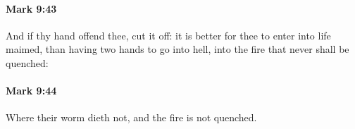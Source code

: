 		\paragraph{Mark 9:43} %
			\label{MARK-9-43}

			And if thy hand offend thee, cut it off: it is better for thee to enter into life maimed, than having two hands to go into hell, into the fire that never shall be quenched:

			\begin{framed}
			\scriptsize
				\begin{compactdesc}
					\item[SBLG] 
				\end{compactdesc}
			\end{framed}

		\paragraph{Mark 9:44} %
			\label{MARK-9-44}

			Where their worm dieth not, and the fire is not quenched.

